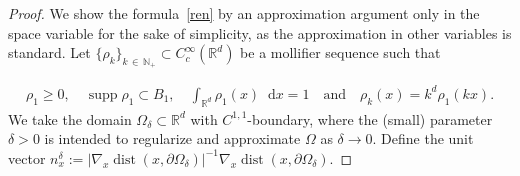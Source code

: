 \documentclass[AHL,Unicode,longabstracts,published]{cedram}
\newcommand*{\dif}{\mathop{}\!\mathrm{d}}
\DeclareMathOperator{\supp}{supp}
\DeclareMathOperator{\dist}{dist}
\newcommand*\p{\partial}
\newcommand*\N {\mathbb{N}}
\newcommand*\R {\mathbb{R}}
\begin{document}
\begin{proof}
We show the formula~\eqref{ren} by an approximation argument only in the space variable for the sake of simplicity, as the approximation in other variables is standard. Let $\{\rho_k\}_{k\,\in\,\N_+}\subset C^\infty_c(\R^{d})$ be a mollifier sequence such that

\begin{align*}
\rho_1\ge 0,\quad
\supp\rho_1\subset B_1,\quad
\int_{\R^{d}}\rho_1(x)\dif x=1 \quad \text{and}\quad
\rho_k(x)=k^{d}\rho_1(kx).
\end{align*}
We take the domain $\Omega_\delta\subset\R^{d}$ with $C^{1,1}$-boundary, where the (small) parameter $\delta>0$ is intended to regularize and approximate $\Omega$ as $\delta\rightarrow0$. Define the unit vector $n_x^\delta:=|\nabla_x \dist(x,\p\Omega_\delta)|^{-1}\nabla_x \dist(x,\p\Omega_\delta)$.


\end{proof}
\end{document}
